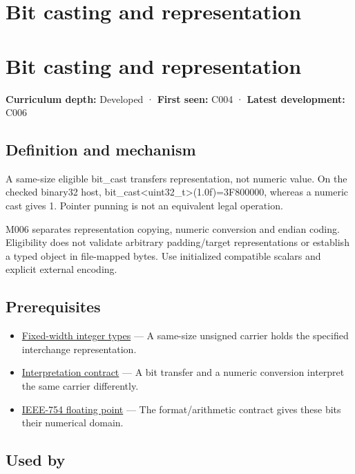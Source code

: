 \hypertarget{appendix-34ee45f161c1}{}
\section*{Bit casting and representation}
\section{Bit casting and representation}\label{appendix-34ee45f161c1-bit-casting-and-representation}

\textbf{Curriculum depth:} Developed · \textbf{First seen:} C004 · \textbf{Latest development:} C006

\subsection{Definition and mechanism}\label{appendix-34ee45f161c1-definition-and-mechanism}

A same-size eligible bit\_cast transfers representation, not numeric value. On the checked binary32 host, bit\_cast\textless uint32\_t\textgreater{}(1.0f)=3F800000, whereas a numeric cast gives 1. Pointer punning is not an equivalent legal operation.

M006 separates representation copying, numeric conversion and endian coding. Eligibility does not validate arbitrary padding/target representations or establish a typed object in file-mapped bytes. Use initialized compatible scalars and explicit external encoding.

\subsection{Prerequisites}\label{appendix-34ee45f161c1-prerequisites}

\begin{itemize}
\tightlist
\item
  \hyperref[appendix-cc04044b5782]{Fixed-width integer types} --- A same-size unsigned carrier holds the specified interchange representation.
\item
  \hyperref[appendix-f414bd4ed05c]{Interpretation contract} --- A bit transfer and a numeric conversion interpret the same carrier differently.
\item
  \hyperref[appendix-343615f49ddf]{IEEE-754 floating point} --- The format/arithmetic contract gives these bits their numerical domain.
\end{itemize}

\subsection{Used by}\label{appendix-34ee45f161c1-used-by}

